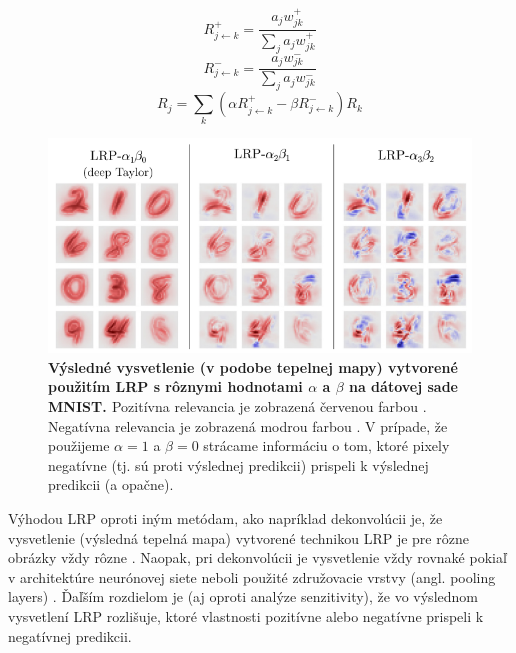 
\begin{equation} 
    R_{j\leftarrow k}^{+} = \frac{a_j w_{j k}^+}{\sum_{j}^{} a_j w_{j k}^+}
    \label{eq:lrp_1}
\end{equation}
\begin{equation} 
    R_{j\leftarrow k}^{-} = \frac{a_j w_{j k}^-}{\sum_{j}^{} a_j w_{j k}^-}
    \label{eq:lrp_2}
\end{equation}
\begin{equation} 
    R_{j}=\sum_{k}^{} \left ( \alpha R_{j\leftarrow k}^{+} - \beta R_{j\leftarrow k}^{-} \right ) R_k
    \label{eq:lrp_3}
\end{equation}

\begin{figure}[h!]
\centering
\includegraphics[scale=0.5]{assets/images/lrp.png}
\caption{\textbf{Výsledné vysvetlenie (v podobe tepelnej mapy) vytvorené použitím LRP s rôznymi hodnotami $\alpha$ a $\beta$ na dátovej sade MNIST. \cite{montavon2018methods}} Pozitívna relevancia je zobrazená červenou farbou \cite{montavon2018methods}. Negatívna relevancia je zobrazená modrou farbou \cite{montavon2018methods}. V prípade, že použijeme $\alpha = 1$ a $\beta = 0$ strácame informáciu o tom, ktoré pixely negatívne (tj. sú proti výslednej predikcii) prispeli k výslednej predikcii (a opačne).}
\label{fig:lrp}
\end{figure}

Výhodou LRP oproti iným metódam, ako napríklad dekonvolúcii je, že vysvetlenie (výsledná tepelná mapa) vytvorené technikou LRP je pre rôzne obrázky vždy rôzne \cite{Muller_Samek_Montavon_Lapuschkin_Arras}. Naopak, pri dekonvolúcii je vysvetlenie vždy rovnaké pokiaľ v architektúre neurónovej siete neboli použité združovacie vrstvy (angl. pooling layers) \cite{Muller_Samek_Montavon_Lapuschkin_Arras}. Ďaľším rozdielom je (aj oproti analýze senzitivity), že vo výslednom vysvetlení LRP rozlišuje, ktoré vlastnosti pozitívne alebo negatívne prispeli k negatívnej predikcii.

